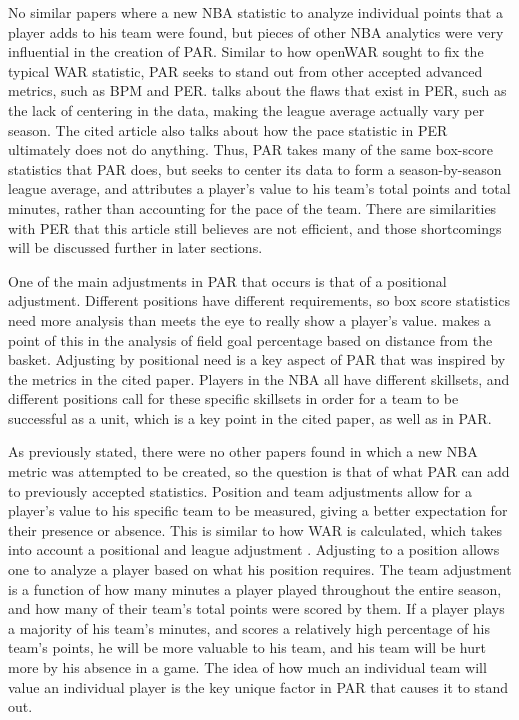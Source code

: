 \documentclass[12pt]{article}
\begin{document}
No similar papers where a new NBA statistic to analyze individual points 
that a player adds to his team were found, but pieces of other NBA 
analytics were very influential in the creation of PAR. Similar to how 
openWAR sought to fix the typical WAR statistic, PAR seeks to stand out 
from other accepted advanced metrics, such as BPM and PER. 
\citet{Hamalian} talks about the flaws that exist in PER, such as the lack 
of centering in the data, making the league average actually vary per 
season. The cited article also talks about how the pace statistic in PER 
ultimately does not do anything. Thus, PAR takes many of the same 
box-score 
statistics that PAR does, but seeks to center its data to form a 
season-by-season league average, and attributes a player's value to his 
team's total points and total minutes, rather than accounting for the pace 
of the team. There are similarities with PER that this article still believes 
are not efficient, and those shortcomings will be discussed further in later 
sections.

One of the main adjustments in PAR that occurs is that of a positional 
adjustment. Different positions have different requirements, so box score 
statistics need more analysis than meets the eye to really show a player's 
value. \citet{Piette} makes a point of this in the analysis of field goal 
percentage based on distance from the basket. Adjusting by positional 
need is a key aspect of PAR that was inspired by the metrics in the cited 
paper. Players in the NBA all have different skillsets, and different 
positions call for these specific skillsets in order for a team to be 
successful as a unit, which is a key point in the cited paper, as well as in 
PAR.

As previously stated, there were no other papers found in which a new 
NBA metric was attempted to be created, so the question is that of what 
PAR can add to previously accepted statistics.
Position and team adjustments 
allow for a player's value to his 
specific team to be measured, giving a better expectation for their 
presence or absence. This is similar to how WAR is calculated, which 
takes into account a positional and league adjustment 
\citep{BaseballWAR}. Adjusting to a 
position allows one to analyze a player based on what his position 
requires. The team adjustment is a function of how 
many minutes a player played 
throughout the entire season, and how many of their team's total points 
were scored by them. If a player 
plays a majority of his team's minutes, and scores a relatively high 
percentage of his team's points, he will 
be more valuable to his team, and his team will be hurt more by his 
absence in a game. The idea of how much an individual team will value 
an individual player is the key unique factor in PAR that causes it to stand 
out.
\end{document}
